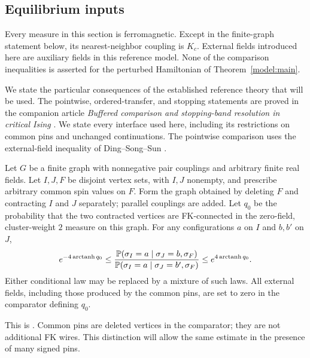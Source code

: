 \subsection{Equilibrium inputs}

Every measure in this section is ferromagnetic. Except in the
finite-graph statement below, its nearest-neighbor coupling is $K_c$.
External fields introduced here are auxiliary fields in this reference
model. None of the comparison inequalities is asserted for the
perturbed Hamiltonian of Theorem~\ref{model:main}.

We state the particular consequences of the established reference
theory that will be used. The pointwise, ordered-transfer, and stopping
statements are proved in the companion article
\emph{Buffered comparison and stopping-band resolution in critical Ising}
\cite{IsingToolkit}. We state every interface used here, including its
restrictions on common pins and unchanged continuations. The
pointwise comparison uses the external-field inequality of
Ding--Song--Sun \cite[Corollary~1.3]{DSS2023}.

\begin{lemma}\label{in:ratio}
Let $G$ be a finite graph with nonnegative pair couplings and arbitrary
finite real fields. Let $I,J,F$ be disjoint vertex sets, with $I,J$
nonempty, and prescribe arbitrary common spin values on $F$. Form the
graph obtained by deleting $F$ and contracting $I$ and $J$ separately;
parallel couplings are added. Let $q_0$ be the probability that the two
contracted vertices are FK-connected in the zero-field, cluster-weight
$2$ measure on this graph. For any configurations $a$ on $I$ and $b,b'$
on $J$,
\begin{equation}\label{in:ratio-bound}
 e^{-4\operatorname{arctanh}q_0}
 \leq
 \frac{\mathbb P(\sigma_I=a\mid\sigma_J=b,\sigma_F)}
      {\mathbb P(\sigma_I=a\mid\sigma_J=b',\sigma_F)}
 \leq e^{4\operatorname{arctanh}q_0}.
\end{equation}
Either conditional law may be replaced by a mixture of such laws.
All external fields, including those produced by the common pins,
are set to zero in the comparator defining $q_0$.
\end{lemma}

This is \cite[Lemma~2.2]{IsingToolkit}. Common pins are deleted vertices in
the comparator; they are not additional FK wires. This distinction
will allow the same estimate in the presence of many signed pins.

